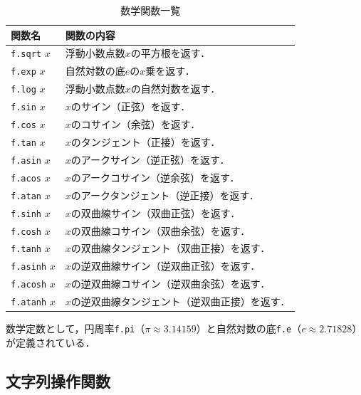 \begin{table}[h]
  \begin{center}
    \begin{tabular}{ | l | p{9cm} |}
    \hline
    関数名 & 関数の内容 \\ \hline
    \texttt{f.sqrt} $x$ & 浮動小数点数$x$の平方根を返す． \\ \hline
    \texttt{f.exp} $x$ & 自然対数の底$e$の$x$乗を返す． \\ \hline
    \texttt{f.log} $x$ & 浮動小数点数$x$の自然対数を返す． \\ \hline
    \texttt{f.sin} $x$ & $x$のサイン（正弦）を返す． \\ \hline
    \texttt{f.cos} $x$ & $x$のコサイン（余弦）を返す． \\ \hline
    \texttt{f.tan} $x$ & $x$のタンジェント（正接）を返す． \\ \hline
    \texttt{f.asin} $x$ & $x$のアークサイン（逆正弦）を返す． \\ \hline
    \texttt{f.acos} $x$ & $x$のアークコサイン（逆余弦）を返す． \\ \hline
    \texttt{f.atan} $x$ & $x$のアークタンジェント（逆正接）を返す． \\ \hline
    \texttt{f.sinh} $x$ & $x$の双曲線サイン（双曲正弦）を返す． \\ \hline
    \texttt{f.cosh} $x$ & $x$の双曲線コサイン（双曲余弦）を返す． \\ \hline
    \texttt{f.tanh} $x$ & $x$の双曲線タンジェント（双曲正接）を返す． \\ \hline
    \texttt{f.asinh} $x$ & $x$の逆双曲線サイン（逆双曲正弦）を返す． \\ \hline
    \texttt{f.acosh} $x$ & $x$の逆双曲線コサイン（逆双曲余弦）を返す． \\ \hline
    \texttt{f.atanh} $x$ & $x$の逆双曲線タンジェント（逆双曲正接）を返す． \\ \hline
    \end{tabular}
\end{center}
    \caption{数学関数一覧}
    \label{tab:mathFunctions}
\end{table}

数学定数として，円周率\lstinline{f.pi}（$\pi \approx 3.14159$）と自然対数の底\lstinline{f.e}（$e \approx 2.71828$）が定義されている．

\subsection{文字列操作関数}

